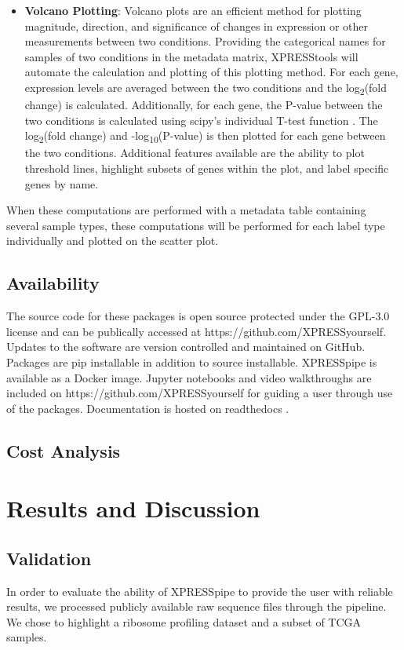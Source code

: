 \documentclass[11pt, a4paper, oneside]{article}
\begin{document}
\begin{itemize}
  \item \textbf{Volcano Plotting}: Volcano plots are an efficient method for plotting magnitude, direction, and significance of changes in expression or other measurements between two conditions. Providing the categorical names for samples of two conditions in the metadata matrix, XPRESStools will automate the calculation and plotting of this plotting method. For each gene, expression levels are averaged between the two conditions and the log\textsubscript{2}(fold change) is calculated. Additionally, for each gene, the P-value between the two conditions is calculated using scipy's individual T-test function \cite{scipy}. The log\textsubscript{2}(fold change) and -log\textsubscript{10}(P-value) is then plotted for each gene between the two conditions. Additional features available are the ability to plot threshold lines, highlight subsets of genes within the plot, and label specific genes by name.

\end{itemize}

When these computations are performed with a metadata table containing several sample types, these computations will be performed for each label type individually and plotted on the scatter plot.

\subsection{Availability}
The source code for these packages is open source protected under the GPL-3.0 license and can be publically accessed at https://github.com/XPRESSyourself. Updates to the software are version controlled and maintained on GitHub. Packages are pip installable in addition to source installable. XPRESSpipe is available as a Docker image. Jupyter notebooks and video walkthroughs are included on https://github.com/XPRESSyourself for guiding a user through use of the packages. Documentation is hosted on readthedocs \cite{readthedocs}.

\subsection{Cost Analysis}



\section{Results and Discussion}

\subsection{Validation}
In order to evaluate the ability of XPRESSpipe to provide the user with reliable results, we processed publicly available raw sequence files through the pipeline. We chose to highlight a ribosome profiling dataset and a subset of TCGA samples.
\end{document}
